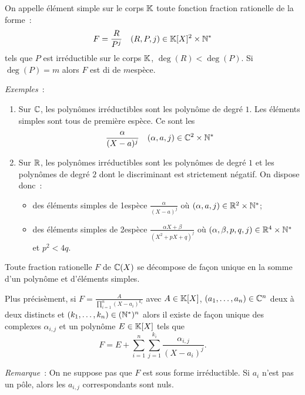 \begin{defdef}
  On appelle élément simple sur le corps \(\mathbb{K}\) toute fonction fraction rationelle de la forme~:
  \begin{equation}
    F=\frac{R}{P^j} \quad (R,P,j) \in \mathbb{K}[X]^2\times \mathbb{N}^*
  \end{equation}
  tels que \(P\) est irréductible sur le corps \(\mathbb{K}\), \(\deg(R) < \deg(P)\). Si \(\deg(P)=m\) alors \(F\) est di de \(m\)\ieme espèce.
\end{defdef}

\emph{Exemples}~:
\begin{enumerate}
\item Sur \(\mathbb{C}\), les polynômes irréductibles sont les polynôme de degré \(1\). Les éléments simples sont tous de première espèce. Ce sont les
  \begin{equation}
    \frac{\alpha}{(X-a)^j} \quad (\alpha,a,j)\in \mathbb{C}^2\times \mathbb{N}^*
  \end{equation}
\item Sur \(\mathbb{R}\), les polynômes irréductibles sont les polynômes de degré \(1\) et les polynômes de degré \(2\) dont le discriminant est strictement négatif. On dispose donc~:
  \begin{itemize}
  \item des éléments simples de 1\iere espèce \(\frac{\alpha}{(X-a)^j}\) où \((\alpha,a,j)\in \mathbb{R}^2\times \mathbb{N}^*\);
  \item des éléments simples de 2\ieme espèce \(\frac{\alpha X+\beta}{(X^2+pX+q)^j}\) où \((\alpha,\beta,p,q,j)\in \mathbb{R}^4\times \mathbb{N}^*\) et \(p^2<4q\).
  \end{itemize}
\end{enumerate}

\begin{theo}
  Toute fraction rationelle \(F\) de \(\mathbb{C}(X)\) se décompose de façon unique en la somme d'un polynôme et d'éléments simples.

  Plus précisèment, si \(F=\frac{A}{\prod_{i=1}^n(X-a_i)^{k_i}}\) avec \(A\in\mathbb{K}[X]\), \((a_1,\ldots,a_n) \in \mathbb{C}^n\) deux à deux distincts et \((k_1,\ldots,k_n)\in (\mathbb{N}^*)^n\) alors il existe de façon unique des complexes \(\alpha_{i,j}\) et un polynôme \(E\in\mathbb{K}[X]\) tels que
  \begin{equation}
    F=E+\sum_{i=1}^n\sum_{j=1}^{k_i} \frac{\alpha_{i,j}}{(X-a_i)^{j}}.
  \end{equation}
\end{theo}

\emph{Remarque}~: On ne suppose pas que \(F\) est sous forme irréductible. Si \(a_i\) n'est pas un pôle, alors les \(a_{i,j}\) correspondants sont nuls.

